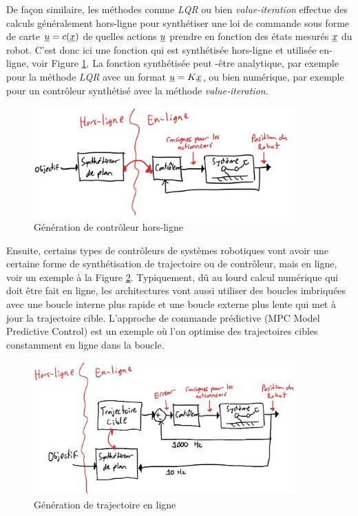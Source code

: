 De façon similaire, les méthodes comme \textit{LQR} ou bien \textit{value-iteration} effectue des calculs généralement hors-ligne pour synthétiser une loi de commande sous forme de carte $\underline{u} = c(\underline{x})$ de quelles actions $\underline{u}$ prendre en fonction des états mesurés $\underline{x}$ du robot. C'est donc ici une fonction qui est synthétisée hors-ligne et utilisée en-ligne, voir Figure \ref{fig:offlinecontrollergeneration}. La fonction synthétisée peut -être analytique, par exemple pour la méthode \textit{LQR} avec un format $\underline{u} = K \underline{x}$, ou bien numérique, par exemple pour un contrôleur synthétisé avec la méthode \textit{value-iteration}.
\begin{figure}[htbp]
	\centering
	\includegraphics[width=0.9\textwidth]{fig/offlinecontrollergeneration.jpg}
	\caption{Génération de contrôleur hors-ligne}
	\label{fig:offlinecontrollergeneration}
\end{figure}

Ensuite, certains types de contrôleurs de systèmes robotiques vont avoir une certaine forme de synthétisation de trajectoire ou de contrôleur, mais en ligne, voir un exemple à la Figure \ref{fig:onlinetrajectorygeneration}. Typiquement, dû au lourd calcul numérique qui doit être fait en ligne, les architectures vont aussi utiliser des boucles imbriquées avec une boucle interne plus rapide et une boucle externe plus lente qui met à jour la trajectoire cible. L'approche de commande prédictive (MPC Model Predictive Control) est un exemple où l'on optimise des trajectoires cibles constamment en ligne dans la boucle.
\begin{figure}[htbp]
	\centering
	\includegraphics[width=0.9\textwidth]{fig/onlinetrajectorygeneration.jpg}
	\caption{Génération de trajectoire en ligne}
	\label{fig:onlinetrajectorygeneration}
\end{figure}




